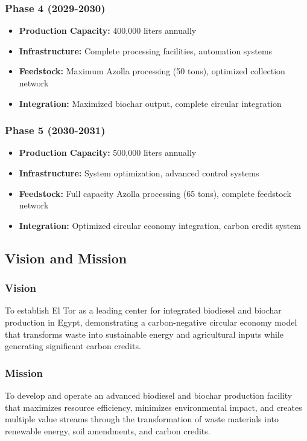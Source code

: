 \subsubsection{Phase 4 (2029-2030)}
\begin{itemize}
    \item \textbf{Production Capacity:} 400,000 liters annually
    \item \textbf{Infrastructure:} Complete processing facilities, automation systems
    \item \textbf{Feedstock:} Maximum Azolla processing (50 tons), optimized collection network
    \item \textbf{Integration:} Maximized biochar output, complete circular integration
\end{itemize}

\subsubsection{Phase 5 (2030-2031)}
\begin{itemize}
    \item \textbf{Production Capacity:} 500,000 liters annually
    \item \textbf{Infrastructure:} System optimization, advanced control systems
    \item \textbf{Feedstock:} Full capacity Azolla processing (65 tons), complete feedstock network
    \item \textbf{Integration:} Optimized circular economy integration, carbon credit system
\end{itemize}

\subsection{Vision and Mission}

\subsubsection{Vision}
To establish El Tor as a leading center for integrated biodiesel and biochar production in Egypt, demonstrating a carbon-negative circular economy model that transforms waste into sustainable energy and agricultural inputs while generating significant carbon credits.

\subsubsection{Mission}
To develop and operate an advanced biodiesel and biochar production facility that maximizes resource efficiency, minimizes environmental impact, and creates multiple value streams through the transformation of waste materials into renewable energy, soil amendments, and carbon credits.

